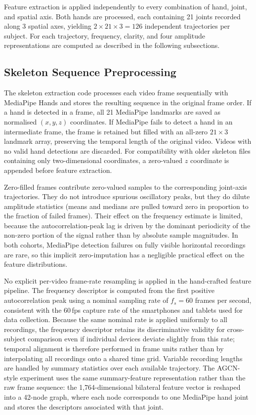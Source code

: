 Feature extraction is applied independently to every combination of hand, joint, and spatial axis. Both hands are processed, each containing 21 joints recorded along 3 spatial axes, yielding $2 \times 21 \times 3 = 126$ independent trajectories per subject. For each trajectory, frequency, clarity, and four amplitude representations are computed as described in the following subsections.

\subsection{Skeleton Sequence Preprocessing}
\label{sec:skeleton_preprocess}

The skeleton extraction code processes each video frame sequentially with MediaPipe Hands and stores the resulting sequence in the original frame order. If a hand is detected in a frame, all 21 MediaPipe landmarks are saved as normalised $(x,y,z)$ coordinates. If MediaPipe fails to detect a hand in an intermediate frame, the frame is retained but filled with an all-zero $21 \times 3$ landmark array, preserving the temporal length of the original video. Videos with no valid hand detections are discarded. For compatibility with older skeleton files containing only two-dimensional coordinates, a zero-valued $z$ coordinate is appended before feature extraction.

Zero-filled frames contribute zero-valued samples to the corresponding joint-axis trajectories. They do not introduce spurious oscillatory peaks, but they do dilute amplitude statistics (means and medians are pulled toward zero in proportion to the fraction of failed frames). Their effect on the frequency estimate is limited, because the autocorrelation-peak lag is driven by the dominant periodicity of the non-zero portion of the signal rather than by absolute sample magnitudes. In both cohorts, MediaPipe detection failures on fully visible horizontal recordings are rare, so this implicit zero-imputation has a negligible practical effect on the feature distributions.

No explicit per-video frame-rate resampling is applied in the hand-crafted feature pipeline. The frequency descriptor is computed from the first positive autocorrelation peak using a nominal sampling rate of $f_s = 60$ frames per second, consistent with the 60\,fps capture rate of the smartphones and tablets used for data collection. Because the same nominal rate is applied uniformly to all recordings, the frequency descriptor retains its discriminative validity for cross-subject comparison even if individual devices deviate slightly from this rate; temporal alignment is therefore performed in frame units rather than by interpolating all recordings onto a shared time grid. Variable recording lengths are handled by summary statistics over each available trajectory. The AGCN-style experiment uses the same summary-feature representation rather than the raw frame sequence: the 1,764-dimensional bilateral feature vector is reshaped into a 42-node graph, where each node corresponds to one MediaPipe hand joint and stores the descriptors associated with that joint.

